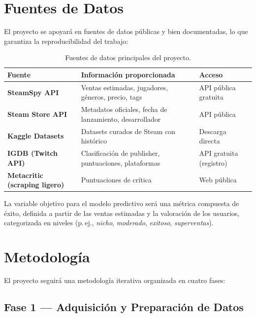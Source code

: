 \documentclass[12pt, a4paper]{article}
\begin{document}
\section{Fuentes de Datos}

El proyecto se apoyar\'a en fuentes de datos p\'ublicas y bien documentadas, lo que garantiza la reproducibilidad del trabajo:

\begin{table}[h!]
\centering
\renewcommand{\arraystretch}{1.4}
\begin{tabular}{>{\bfseries}p{3.5cm} p{5.5cm} p{4.5cm}}
\toprule
Fuente & Informaci\'on proporcionada & Acceso \\
\midrule
SteamSpy API        & Ventas estimadas, jugadores, g\'eneros, precio, tags & API p\'ublica gratuita \\
Steam Store API     & Metadatos oficiales, fecha de lanzamiento, desarrollador & API p\'ublica \\
Kaggle Datasets     & Datasets curados de Steam con hist\'orico & Descarga directa \\
IGDB (Twitch API)   & Clasificaci\'on de publisher, puntuaciones, plataformas & API gratuita (registro) \\
Metacritic (scraping ligero) & Puntuaciones de cr\'itica & Web p\'ublica \\
\bottomrule
\end{tabular}
\caption{Fuentes de datos principales del proyecto.}
\end{table}

La variable objetivo para el modelo predictivo ser\'a una m\'etrica compuesta de \'exito, definida a partir de las ventas estimadas y la valoraci\'on de los usuarios, categorizada en niveles (p.\,ej., \textit{nicho}, \textit{moderado}, \textit{exitoso}, \textit{superventas}).

\section{Metodolog\'ia}

El proyecto seguir\'a una metodolog\'ia iterativa organizada en cuatro fases:

\subsection{Fase 1 --- Adquisici\'on y Preparaci\'on de Datos}
\end{document}
